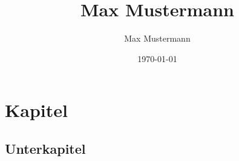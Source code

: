 \documentclass[a4paper]{scrreprt}
\begin{document}
\newcommand{\ThesisAuthor}{Max Mustermann}
\newcommand{\ThesisTitle}{Max Mustermann}

\author{\ThesisAuthor}
\title{\ThesisTitle}
\date{\today}

\maketitle
\tableofcontents

\section{Kapitel}

\subsection{Unterkapitel}


\end{document}
